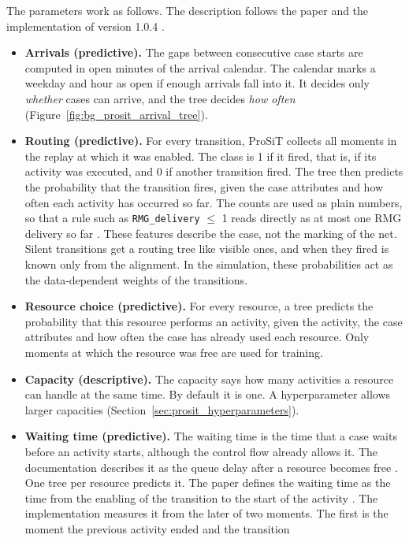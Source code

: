 The parameters work as follows. The description follows the paper and the
implementation of version 1.0.4 \cite{Vinci2026prosit,ProSiTRepository}.
\begin{itemize}[itemsep=3pt,topsep=4pt]
\item \textbf{Arrivals (predictive).} The gaps between consecutive case starts are
computed in open minutes of the arrival calendar. The calendar marks a weekday
and hour as open if enough arrivals fall into it. It decides only \emph{whether}
cases can arrive, and the tree decides \emph{how often}
(Figure~\ref{fig:bg_prosit_arrival_tree}).
\item \textbf{Routing (predictive).} For every transition, ProSiT collects all moments in
the replay at which it was enabled. The class is 1 if it fired, that is, if its
activity was executed, and 0 if another transition fired. The tree then predicts
the probability that the transition fires, given the case attributes and how
often each activity has occurred so far. The counts are used as plain numbers, so
that a rule such as \texttt{RMG\_delivery} $\le$ 1 reads directly as at most one
RMG delivery so far \cite{ProSiTDocs}. These features describe the case, not the
marking of the net. Silent transitions get a routing tree like visible ones,
and when they fired is known only from the alignment. In the simulation, these
probabilities act as the data-dependent weights of the transitions.
\item \textbf{Resource choice (predictive).} For every resource, a tree predicts the
probability that this resource performs an activity, given the activity, the case
attributes and how often the case has already used each resource. Only moments at
which the resource was free are used for training.
\item \textbf{Capacity (descriptive).} The capacity says how many activities a resource can
handle at the same time. By default it is one. A hyperparameter allows larger
capacities (Section~\ref{sec:prosit_hyperparameters}).
\item \textbf{Waiting time (predictive).} The waiting time is the time that a case waits
before an activity starts, although the control flow already allows it. The
documentation describes it as the queue delay after a resource becomes free
\cite{ProSiTDocs}. One tree per resource predicts it. The paper defines the
waiting time as the time from the enabling of the transition to the start of the
activity \cite{Vinci2026prosit}. The implementation measures it from the later of two
moments. The first is the moment the previous activity ended and the transition

\end{itemize}

